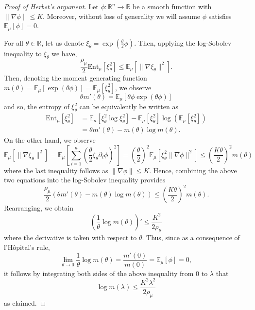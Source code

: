 \begin{proof}[Proof of Herbst's argument]
  Let \(\phi : \mathbb{R}^n \to \mathbb{R}\) be a smooth function with \(\|\nabla \phi\| \le K\). Moreover,
  without loss of generality we will assume \(\phi\) satisfies \(\mathbb{E}_\mu[\phi] = 0\). 
  
  For all \(\theta \in \mathbb{R}\), let us denote \(\xi_\theta = \exp\left(\frac{\theta}{2}\phi\right)\). 
  Then, applying the log-Sobolev inequality to \(\xi_\theta\) we have, 
  \[\frac{\rho_\mu}{2} \text{Ent}_\mu[\xi_\theta^2]
    \le \mathbb{E}_\mu[\|\nabla\xi_\theta\|^2].\]
  Then, denoting the moment generating function \(m(\theta) = \mathbb{E}_\mu[\exp(\theta \phi)] = 
  \mathbb{E}_\mu[\xi_\theta^2]\), we observe 
  \[\theta m'(\theta) = \mathbb{E}_\mu[\theta \phi \exp(\theta \phi)]\]
  and so, the entropy of \(\xi_\theta^2\) can be equivalently be written as
  \begin{align*}
    \text{Ent}_\mu[\xi_\theta^2] 
    & = \mathbb{E}_\mu[\xi_\theta^2 \log \xi_\theta^2] - \mathbb{E}_{\mu}[\xi_\theta^2]\log(\mathbb{E}_\mu[\xi_\theta^2])\\
    & = \theta m'(\theta) - m(\theta)\log m(\theta).
  \end{align*}
  On the other hand, we observe 
  \[\mathbb{E}_\mu[\|\nabla\xi_\theta\|^2] 
    = \mathbb{E}_\mu\left[\sum_{i = 1}^n \left(\frac{\theta}{2}\xi_\theta \partial_i \phi\right)^2\right]
    = \left(\frac{\theta}{2}\right)^2 \mathbb{E}_\mu[\xi_\theta^2 \|\nabla \phi\|^2]
    \le \left(\frac{K\theta}{2}\right)^2 m(\theta)\]
  where the last inequality follows as \(\|\nabla \phi\| \le K\). Hence, combining the above two equations 
  into the log-Sobolev inequality provides 
  \[\frac{\rho_\mu}{2}(\theta m'(\theta) - m(\theta) \log m(\theta)) \le \left(\frac{K\theta}{2}\right)^2 m(\theta).\]
  Rearranging, we obtain 
  \[\left(\frac{1}{\theta}\log m(\theta)\right)' \le \frac{K^2}{2 \rho_\mu}\]
  where the derivative is taken with respect to \(\theta\). Thus, since as a consequence of l'Hôpital's rule,
  \[\lim_{\theta \to 0} \frac{1}{\theta}\log m(\theta) = \frac{m'(0)}{m(0)} = \mathbb{E}_\mu[\phi] = 0,\]
  it follows by integrating both sides of the above inequality from 0 to \(\lambda\) that 
  \[\log m(\lambda) \le \frac{K^2 \lambda^2}{2\rho_\mu}\]
  as claimed.
\end{proof}